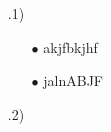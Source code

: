 \documentclass[12pt]{scrartcl}
\begin{document}
\exercise{}
\begin{itemize}
    \item[\theenumi.1)] \begin{itemize}
                            \item[$\bullet$] akjfbkjhf
                            \item[$\bullet$] jalnABJF
                        \end{itemize}
    \item[\theenumi.2)]
\end{itemize}
\end{document}
